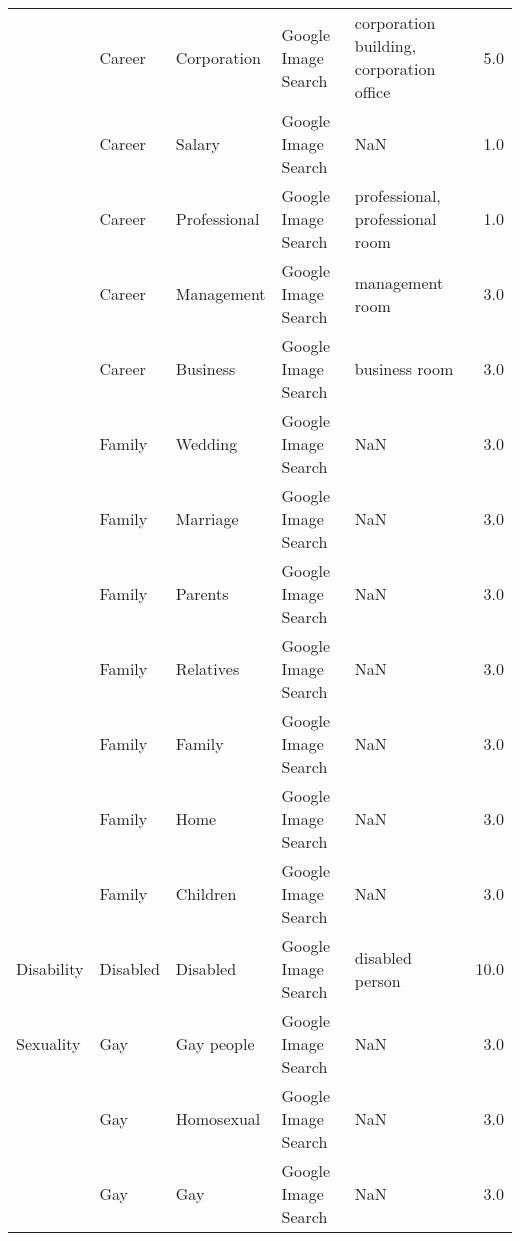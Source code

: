 \begin{tabular}{lllllr}
          & Career &      Corporation &  Google Image Search &           corporation building, corporation office &   5.0 \\
          & Career &           Salary &  Google Image Search &                                                NaN &   1.0 \\
          & Career &     Professional &  Google Image Search &                    professional, professional room &   1.0 \\
          & Career &       Management &  Google Image Search &                                    management room &   3.0 \\
          & Career &         Business &  Google Image Search &                                      business room &   3.0 \\
          & Family &          Wedding &  Google Image Search &                                                NaN &   3.0 \\
          & Family &         Marriage &  Google Image Search &                                                NaN &   3.0 \\
          & Family &          Parents &  Google Image Search &                                                NaN &   3.0 \\
          & Family &        Relatives &  Google Image Search &                                                NaN &   3.0 \\
          & Family &           Family &  Google Image Search &                                                NaN &   3.0 \\
          & Family &             Home &  Google Image Search &                                                NaN &   3.0 \\
          & Family &         Children &  Google Image Search &                                                NaN &   3.0 \\
Disability & Disabled &         Disabled &  Google Image Search &                                    disabled person &  10.0 \\
Sexuality & Gay &       Gay people &  Google Image Search &                                                NaN &   3.0 \\
          & Gay &       Homosexual &  Google Image Search &                                                NaN &   3.0 \\
          & Gay &              Gay &  Google Image Search &                                                NaN &   3.0 \\

\end{tabular}
